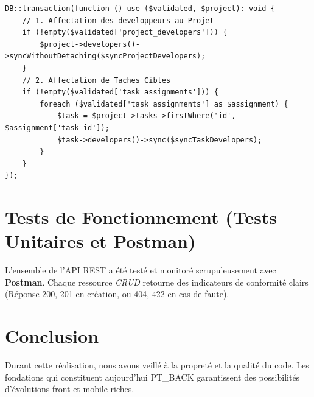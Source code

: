 \begin{lstlisting}[language=PHP_Laravel, caption={Assignations avec Transactions BD}]
DB::transaction(function () use ($validated, $project): void {
    // 1. Affectation des developpeurs au Projet
    if (!empty($validated['project_developers'])) {
        $project->developers()->syncWithoutDetaching($syncProjectDevelopers);
    }
    // 2. Affectation de Taches Cibles
    if (!empty($validated['task_assignments'])) {
        foreach ($validated['task_assignments'] as $assignment) {
            $task = $project->tasks->firstWhere('id', $assignment['task_id']);
            $task->developers()->sync($syncTaskDevelopers);
        }
    }
});
\end{lstlisting}

\section{Tests de Fonctionnement (Tests Unitaires et Postman)}
L'ensemble de l'API REST a \'{e}t\'{e} test\'{e} et monitor\'{e} scrupuleusement avec \textbf{Postman}.
Chaque ressource \textit{CRUD} retourne des indicateurs de conformit\'{e} clairs
(R\'{e}ponse 200, 201 en cr\'{e}ation, ou 404, 422 en cas de faute).

\section{Conclusion}
Durant cette r\'{e}alisation, nous avons veill\'{e} \`{a} la propret\'{e} et la qualit\'{e} du code.
Les fondations qui constituent aujourd'hui PT\_BACK garantissent des possibilit\'{e}s
d'\'{e}volutions front et mobile riches.
